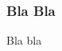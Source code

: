 \documentclass[10pt,fleqn,xcolor=svgnames]{beamer}
\begin{document}
\begin{frame}
\frametitle{Bla Bla}

Bla bla

\end{frame}
\end{document}
